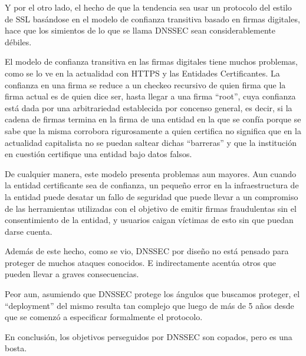 Y por el otro lado, el hecho de que la tendencia sea usar un protocolo del
estilo de SSL bas\'andose en el modelo de confianza transitiva basado en firmas
digitales, hace que los simientos de lo que se llama DNSSEC sean
considerablemente d\'ebiles. 

El modelo de confianza transitiva en las firmas digitales tiene muchos
problemas, como se lo ve en la actualidad con HTTPS y las Entidades
Certificantes. La confianza en una firma se reduce a un checkeo recursivo de
quien firma que la firma actual es de quien dice ser, hasta llegar a una firma
``root'', cuya confianza est\'a dada por una arbitrariedad establecida por
concenso general, es decir, si la cadena de firmas termina en la firma de una
entidad en la que se conf\'ia porque se sabe que la misma corrobora
rigurosamente a quien certifica no significa que en la actualidad capitalista
no se puedan saltear dichas ``barreras'' y que la instituci\'on en cuesti\'on
certifique una entidad bajo datos falsos.

De cualquier manera, este modelo presenta problemas aun mayores. Aun cuando la
entidad certificante sea de confianza, un peque\~no error en la infraestructura
de la entidad puede desatar un fallo de seguridad que puede llevar a un
compromiso de las herramientas utilizadas con el objetivo de emitir firmas
fraudulentas sin el consentimiento de la entidad, y usuarios caigan v\'ictimas
de esto sin que puedan darse cuenta.

Adem\'as de este hecho, como se vio, DNSSEC por dise\~no no est\'a pensado para
proteger de muchos ataques conocidos. E indirectamente acent\'ua otros que
pueden llevar a graves consecuencias.

Peor aun, asumiendo que DNSSEC protege los \'angulos que buscamos proteger, el
``deployment'' del mismo resulta tan complejo que luego de m\'as de 5 años desde
que se comenz\'o a especificar formalmente el protocolo.

En conclusi\'on, los objetivos perseguidos por DNSSEC son copados, pero es una
bosta.